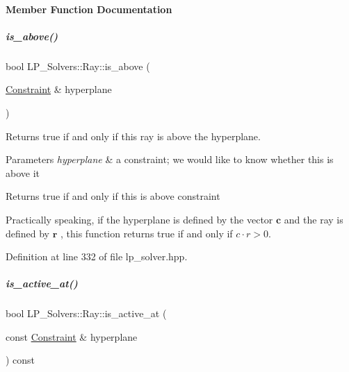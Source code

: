 \paragraph{Member Function Documentation}
\mbox{\label{group___c_l_s_solvers_aec0fb992267a74f098fef5ca6c159cad}} 
\subparagraph{\texorpdfstring{is\+\_\+above()}{is\_above()}}
{\footnotesize\ttfamily bool L\+P\+\_\+\+Solvers\+::\+Ray\+::is\+\_\+above (\begin{DoxyParamCaption}\item[{\hyperlink{group___c_l_s_solvers_class_l_p___solvers_1_1_constraint}{Constraint} \&}]{hyperplane }\end{DoxyParamCaption})\hspace{0.3cm}{\ttfamily [inline]}}



Returns {\ttfamily true} if and only if this ray is above the hyperplane. 


\begin{DoxyParams}{Parameters}
{\em hyperplane} & a constraint; we would like to know whether {\ttfamily this} is above it \\
\hline
\end{DoxyParams}
\begin{DoxyReturn}{Returns}
true if and only if {\ttfamily this} is above {\ttfamily constraint} 
\end{DoxyReturn}
Practically speaking, if the hyperplane is defined by the vector $ \mathbf c $ and the ray is defined by $ \mathbf r $ , this function returns true if and only if $ c\cdot r > 0 $. 

Definition at line 332 of file lp\+\_\+solver.\+hpp.

\mbox{\label{group___c_l_s_solvers_a935fd2cf258315c989cd4edce32371e7}} 
\subparagraph{\texorpdfstring{is\+\_\+active\+\_\+at()}{is\_active\_at()}}
{\footnotesize\ttfamily bool L\+P\+\_\+\+Solvers\+::\+Ray\+::is\+\_\+active\+\_\+at (\begin{DoxyParamCaption}\item[{const \hyperlink{group___c_l_s_solvers_class_l_p___solvers_1_1_constraint}{Constraint} \&}]{hyperplane }\end{DoxyParamCaption}) const\hspace{0.3cm}{\ttfamily [inline]}}



